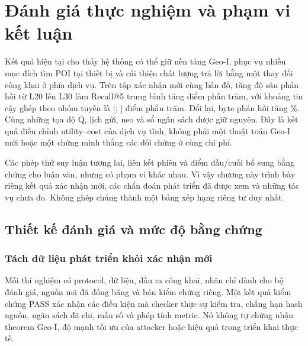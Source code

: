 \chapter{Đánh giá thực nghiệm và phạm vi kết luận}
\label{ch:experiments}







Kết quả hiện tại cho thấy hệ thống có thể giữ nền tảng Geo-I, phục vụ nhiều mục
đích tìm POI tại thiết bị và cải thiện chất lượng trả lời bằng một thay đổi công
khai ở phía dịch vụ. Trên tập xác nhận mới cùng bản đồ, tăng độ sâu phản hồi từ
L20 lên L30 làm Recall@5 trung bình tăng \EvalFreshGain{} điểm phần trăm, với
khoảng tin cậy ghép theo nhóm tuyến là
[\EvalFreshLow{}; \EvalFreshHigh{}] điểm phần trăm. Đổi lại, byte phản hồi tăng
\EvalReplyGrowth{}\%. Cùng những tọa độ Q, lịch gửi, neo và sổ ngân sách được
giữ nguyên. Đây là kết quả điều chỉnh utility--cost của dịch vụ tĩnh, không phải
một thuật toán Geo-I mới hoặc một chứng minh thắng các đối chứng ở cùng chi phí.

Các phép thử suy luận tương lai, liên kết phiên và điểm đầu/cuối bổ sung bằng
chứng cho luận văn, nhưng có phạm vi khác nhau. Vì vậy chương này trình bày
riêng kết quả xác nhận mới, các chẩn đoán phát triển đã được xem và những tác vụ
chưa đo. Không ghép chúng thành một bảng xếp hạng riêng tư duy nhất.

\section{Thiết kế đánh giá và mức độ bằng chứng}
\label{sec:current-evidence-design}

\subsection{Tách dữ liệu phát triển khỏi xác nhận mới}

Mỗi thí nghiệm có protocol, dữ liệu, đầu ra công khai, nhãn chỉ dành cho bộ
đánh giá, nguồn mã đã đóng băng và bản kiểm chứng riêng. Một kết quả kiểm chứng
PASS xác nhận các điều kiện mà checker thực sự kiểm tra, chẳng hạn hash nguồn,
ngân sách đã chi, mẫu số và phép tính metric. Nó không tự chứng nhận theorem
Geo-I, độ mạnh tối ưu của attacker hoặc hiệu quả trong triển khai thực tế.

